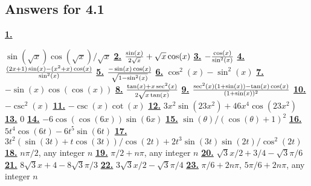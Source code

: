 \subsection *{Answers for 4.1}
\hypertarget {a:4.1.1}{\hyperlink {e:4.1.1}{\bfseries 1.}} \mdseries $\sin (\sqrt {x})\cos (\sqrt {x})/\sqrt {x}$\qquad 
\hypertarget {a:4.1.2}{\hyperlink {e:4.1.2}{\bfseries 2.}} \mdseries ${\sin (x)\over 2\sqrt x}+\sqrt {x}\cos (x)$\qquad 
\hypertarget {a:4.1.3}{\hyperlink {e:4.1.3}{\bfseries 3.}} \mdseries $ -{\cos (x)\over \sin ^2(x)}$\qquad 
\hypertarget {a:4.1.4}{\hyperlink {e:4.1.4}{\bfseries 4.}} \mdseries ${(2x +1)\sin (x) - (x^2+x)\cos (x) \over \sin ^2 (x)}$\qquad 
\hypertarget {a:4.1.5}{\hyperlink {e:4.1.5}{\bfseries 5.}} \mdseries ${-\sin (x)\cos (x)\over \sqrt {1-\sin ^2(x)}}$\qquad 
\hypertarget {a:4.1.6}{\hyperlink {e:4.1.6}{\bfseries 6.}} \mdseries $\cos ^2(x)-\sin ^2(x)$\qquad 
\hypertarget {a:4.1.7}{\hyperlink {e:4.1.7}{\bfseries 7.}} \mdseries $-\sin (x)\cos (\cos (x))$\qquad 
\hypertarget {a:4.1.8}{\hyperlink {e:4.1.8}{\bfseries 8.}} \mdseries ${\tan (x)+x\sec ^2(x)\over 2\sqrt {x\tan (x)}}$\qquad 
\hypertarget {a:4.1.9}{\hyperlink {e:4.1.9}{\bfseries 9.}} \mdseries ${\sec ^2(x)(1+\sin (x))-\tan (x) \cos (x)\over (1+\sin (x))^2}$\qquad 
\hypertarget {a:4.1.10}{\hyperlink {e:4.1.10}{\bfseries 10.}} \mdseries $ -\csc ^2(x)$\qquad 
\hypertarget {a:4.1.11}{\hyperlink {e:4.1.11}{\bfseries 11.}} \mdseries $ -\csc (x)\cot (x)$\qquad 
\hypertarget {a:4.1.12}{\hyperlink {e:4.1.12}{\bfseries 12.}} \mdseries $3x^2\sin (23x^2)+46x^4\cos (23x^2)$\qquad 
\hypertarget {a:4.1.13}{\hyperlink {e:4.1.13}{\bfseries 13.}} \mdseries $0$\qquad 
\hypertarget {a:4.1.14}{\hyperlink {e:4.1.14}{\bfseries 14.}} \mdseries $-6\cos (\cos (6x))\sin (6x)$\qquad 
\hypertarget {a:4.1.15}{\hyperlink {e:4.1.15}{\bfseries 15.}} \mdseries $\sin (\theta )/(\cos (\theta )+1)^2$\qquad 
\hypertarget {a:4.1.16}{\hyperlink {e:4.1.16}{\bfseries 16.}} \mdseries $5t^4\cos (6t)-6t^5\sin (6t)$\qquad 
\hypertarget {a:4.1.17}{\hyperlink {e:4.1.17}{\bfseries 17.}} \mdseries $3t^2(\sin (3t)+t\cos (3t))/\cos (2t)+2t^3\sin (3t)\sin (2t)/\cos ^2(2t)$\qquad 
\hypertarget {a:4.1.18}{\hyperlink {e:4.1.18}{\bfseries 18.}} \mdseries $n\pi /2$, any integer $n$\qquad 
\hypertarget {a:4.1.19}{\hyperlink {e:4.1.19}{\bfseries 19.}} \mdseries $\pi /2+n\pi $, any integer $n$\qquad 
\hypertarget {a:4.1.20}{\hyperlink {e:4.1.20}{\bfseries 20.}} \mdseries $\sqrt 3x/2+3/4-\sqrt 3\pi /6$\qquad 
\hypertarget {a:4.1.21}{\hyperlink {e:4.1.21}{\bfseries 21.}} \mdseries $8\sqrt 3x+4-8\sqrt 3\pi /3$\qquad 
\hypertarget {a:4.1.22}{\hyperlink {e:4.1.22}{\bfseries 22.}} \mdseries $3\sqrt 3x/2-\sqrt 3\pi /4$\qquad 
\hypertarget {a:4.1.23}{\hyperlink {e:4.1.23}{\bfseries 23.}} \mdseries $\pi /6+2n\pi $, $5\pi /6+2n\pi $, any integer $n$\qquad 
